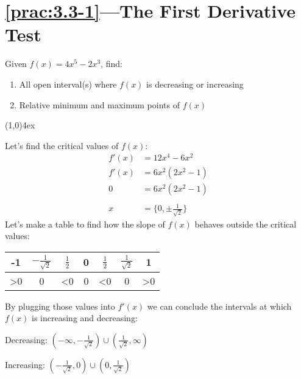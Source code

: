 \documentclass{MathNotes}
\newcommand{\br}{
	\begin{center}
		\line(1,0){4ex}
	\end{center}}
\begin{document}
\section*{\ref{prac:3.3-1}---The First Derivative Test}\label{ans:3.3-1}
Given $\displaystyle f(x)=4x^5-2x^3$, find:
\begin{enumerate}
	\item All open interval(s) where $f(x)$ is decreasing or increasing
	\item Relative minimum and maximum points of $f(x)$
\end{enumerate}
\br
Let's find the critical values of $f(x)$:
\begin{align*}
	f'(x) & =12x^4-6x^2                  \\
	f'(x) & =6x^2(2x^2-1)                \\
	0     & =6x^2(2x^2-1)                \\
	\\
	x     & =\{0,\pm\frac{1}{\sqrt{2}}\}
\end{align*}
Let's make a table to find how the slope of $f(x)$ behaves outside the critical
values:
\begin{center}
	\begin{tabular}{c|c|c|c|c|c|c}
		-1          & $-\frac{1}{\sqrt{2}}$ & $\frac{1}{2}$ & 0 & $\frac{1}{2}$ & $\frac{1}
		{\sqrt{2}}$ & 1                                                                     \\
		\hline
		>0          & 0                     & <0            & 0 & <0            & 0
		            & >0
	\end{tabular}
\end{center}
By plugging those values into $f'(x)$ we can conclude the intervals at which
$f(x)$ is increasing and decreasing:
\begin{multicols}{2}
	Decreasing: $(-\infty,-\frac{1}{\sqrt{2}})\cup(\frac{1}{\sqrt{2}},\infty)$

	Increasing: $(-\frac{1}{\sqrt{2}},0)\cup(0,\frac{1}{\sqrt{2}})$
\end{multicols}
\end{document}
